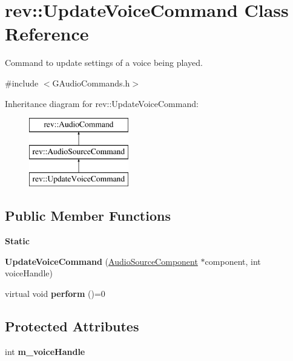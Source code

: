\hypertarget{classrev_1_1_update_voice_command}{}\section{rev\+::Update\+Voice\+Command Class Reference}
\label{classrev_1_1_update_voice_command}


Command to update settings of a voice being played.  




{\ttfamily \#include $<$G\+Audio\+Commands.\+h$>$}

Inheritance diagram for rev\+::Update\+Voice\+Command\+:\begin{figure}[H]
\begin{center}
\leavevmode
\includegraphics[height=3.000000cm]{classrev_1_1_update_voice_command}
\end{center}
\end{figure}
\subsection*{Public Member Functions}
\begin{Indent}\textbf{ Static}\par
\begin{DoxyCompactItemize}
\item 
\mbox{\label{classrev_1_1_update_voice_command_ae7fa1dc2a7d8ed243c6485304423d39b}} 
{\bfseries Update\+Voice\+Command} (\mbox{\hyperlink{classrev_1_1_audio_source_component}{Audio\+Source\+Component}} $\ast$component, int voice\+Handle)
\item 
\mbox{\label{classrev_1_1_update_voice_command_acabb6d14d50969f0f9b61e4aeb0a1872}} 
virtual void {\bfseries perform} ()=0
\end{DoxyCompactItemize}
\end{Indent}
\subsection*{Protected Attributes}
\begin{DoxyCompactItemize}
\item 
\mbox{\label{classrev_1_1_update_voice_command_abfc6bc8e580da161863baca9bf361160}} 
int {\bfseries m\+\_\+voice\+Handle}
\end{DoxyCompactItemize}


